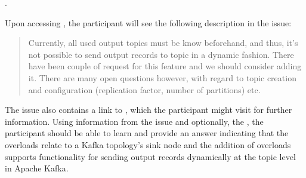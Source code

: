 {\begin{center}
  .
\end{center}

Upon accessing , the participant will see the following description in the issue:

\begin{quote}
  \textsf{
    Currently, all used output topics must be know beforehand, and thus, it's not possible to send output records to topic in a dynamic fashion.
    There have been couple of request for this feature and we should consider adding it.
    There are many open questions however, with regard to topic creation and configuration (replication factor, number of partitions) etc.
  }
\end{quote}

The issue also contains a  link to ,
which the participant might visit for further information.
Using information from the issue and optionally, the , 
the participant should be able to learn and provide an answer indicating that
the overloads relate to a Kafka topology's sink node and the addition of overloads
supports functionality for sending output records dynamically at the topic level in Apache Kafka.}

